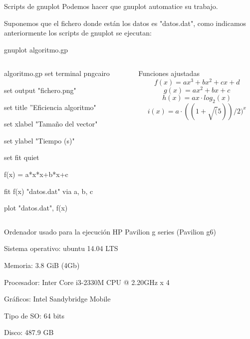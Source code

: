 \documentclass[compress]{beamer}
\begin{document}
\begin{frame}
	\begin{block}{Scripts de gnuplot}
		Podemos hacer que gnuplot automatice su trabajo.
		
		Suponemos que el fichero donde están los datos es "datos.dat", como indicamos anteriormente los scripts de gnuplot se ejecutan:
		
		\hspace{2cm} gnuplot algoritmo.gp
	\end{block}
	\pause
	
	\begin{columns}
	\begin{column}{5cm}
	\begin{exampleblock}{algoritmo.gp}
	set terminal pngcairo
	
	set output "fichero.png"
	
	set title ''Eficiencia algoritmo"
	
	set xlabel "Tamaño del vector"

	set ylabel "Tiempo (s)"

	set fit quiet

	f(x) = a*x*x+b*x+c

	fit f(x) "datos.dat" via a, b, c

	plot "datos.dat", f(x)
	\end{exampleblock}
	\end{column}
	\pause
	
	\begin{column}{5cm}
	\begin{block}{Funciones ajustadas}
		\[f(x)=ax^3 + bx^2 + cx + d\]
		\[g(x)=ax^2 + bx + c\]
		\[h(x)=ax\cdot log_2(x)\]
		\[i(x)=a \cdot ((1+ \sqrt(5))/2)^x\]
	\end{block}
	\end{column}
	
	\end{columns}
\end{frame}

\begin{frame}
	\begin{alertblock}{Ordenador usado para la ejecuci\'on}
	HP Pavilion g series (Pavilion g6)

	Sistema operativo: ubuntu 14.04 LTS

	Memoria: 3.8 GiB (4Gb)

	Procesador: Inter Core i3-2330M CPU @ 2.20GHz x 4

	Gráficos: Intel Sandybridge Mobile

	Tipo de SO: 64 bits

	Disco: 487.9 GB	
	\end{alertblock}
\end{frame}
\end{document}
